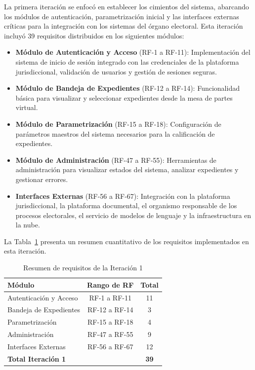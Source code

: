 \documentclass[12pt,a4paper,oneside]{book}
\begin{document}
La primera iteración se enfocó en establecer los cimientos del sistema, abarcando los módulos de autenticación, parametrización inicial y las interfaces externas críticas para la integración con los sistemas del órgano electoral. Esta iteración incluyó 39 requisitos distribuidos en los siguientes módulos:

\begin{itemize}
    \item \textbf{Módulo de Autenticación y Acceso} (RF-1 a RF-11): Implementación del sistema de inicio de sesión integrado con las credenciales de la plataforma jurisdiccional, validación de usuarios y gestión de sesiones seguras.
    \item \textbf{Módulo de Bandeja de Expedientes} (RF-12 a RF-14): Funcionalidad básica para visualizar y seleccionar expedientes desde la mesa de partes virtual.
    \item \textbf{Módulo de Parametrización} (RF-15 a RF-18): Configuración de parámetros maestros del sistema necesarios para la calificación de expedientes.
    \item \textbf{Módulo de Administración} (RF-47 a RF-55): Herramientas de administración para visualizar estados del sistema, analizar expedientes y gestionar errores.
    \item \textbf{Interfaces Externas} (RF-56 a RF-67): Integración con la plataforma jurisdiccional, la plataforma documental, el organismo responsable de los procesos electorales, el servicio de modelos de lenguaje y la infraestructura en la nube.
\end{itemize}

La Tabla~\ref{tab:iteracion1-resumen} presenta un resumen cuantitativo de los requisitos implementados en esta iteración.

\begin{table}[H]
\centering
\caption{Resumen de requisitos de la Iteración 1}
\label{tab:iteracion1-resumen}
\begin{tabular}{@{}lcc@{}}
\toprule
\textbf{Módulo} & \textbf{Rango de RF} & \textbf{Total} \\
\midrule
Autenticación y Acceso & RF-1 a RF-11 & 11 \\
Bandeja de Expedientes & RF-12 a RF-14 & 3 \\
Parametrización & RF-15 a RF-18 & 4 \\
Administración & RF-47 a RF-55 & 9 \\
Interfaces Externas & RF-56 a RF-67 & 12 \\
\midrule
\textbf{Total Iteración 1} & & \textbf{39} \\
\bottomrule
\end{tabular}
\end{table}
\end{document}
